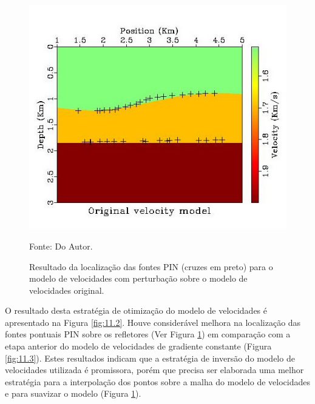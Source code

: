 \begin{figure}[H]
\caption{Resultado da localização das fontes PIN (cruzes em preto)
para o modelo de velocidades com perturbação sobre o modelo de velocidades original.}
\begin{center}
\includegraphics[scale=2.1]{images/endresult.jpeg}
\vspace{-0.3cm}
\end{center}
\begin{center}
 Fonte: Do Autor.
\end{center}
\label{fig:11.4}
\end{figure}

O resultado desta estratégia de otimização do modelo de velocidades é apresentado na Figura \ref{fig:11.2}.
Houve considerável melhora na localização das fontes pontuais PIN sobre os refletores (Ver
Figura \ref{fig:11.4}) em comparação com a etapa anterior do modelo de velocidades de
gradiente constante (Figura \ref{fig:11.3}).
Estes resultados indicam que a estratégia de inversão do modelo de velocidades utilizada é promissora, porém
que precisa ser elaborada uma melhor estratégia para a interpolação dos pontos sobre a malha do modelo de
velocidades e para suavizar o modelo (Figura \ref{fig:11.4}).
